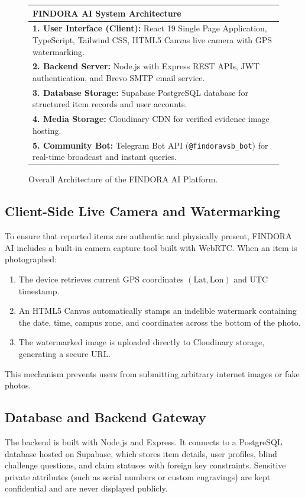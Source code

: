 \documentclass[conference]{IEEEtran}
\begin{document}
\begin{figure}[htbp]
\centering
\small
\setlength{\tabcolsep}{4pt}
\begin{tabular}{|p{}|}
\hline
\textbf{FINDORA AI System Architecture} \\
\hline
\textbf{1. User Interface (Client):} React 19 Single Page Application, TypeScript, Tailwind CSS, HTML5 Canvas live camera with GPS watermarking. \\
\textbf{2. Backend Server:} Node.js with Express REST APIs, JWT authentication, and Brevo SMTP email service. \\
\textbf{3. Database Storage:} Supabase PostgreSQL database for structured item records and user accounts. \\
\textbf{4. Media Storage:} Cloudinary CDN for verified evidence image hosting. \\
\textbf{5. Community Bot:} Telegram Bot API (\texttt{@findoravsb\_bot}) for real-time broadcast and instant queries. \\
\hline
\end{tabular}
\caption{Overall Architecture of the FINDORA AI Platform.}
\label{fig:architecture}
\end{figure}

\subsection{Client-Side Live Camera and Watermarking}
To ensure that reported items are authentic and physically present, FINDORA AI includes a built-in camera capture tool built with WebRTC. When an item is photographed:
\begin{enumerate}
    \item The device retrieves current GPS coordinates $(\text{Lat}, \text{Lon})$ and UTC timestamp.
    \item An HTML5 Canvas automatically stamps an indelible watermark containing the date, time, campus zone, and coordinates across the bottom of the photo.
    \item The watermarked image is uploaded directly to Cloudinary storage, generating a secure URL.
\end{enumerate}
This mechanism prevents users from submitting arbitrary internet images or fake photos.

\subsection{Database and Backend Gateway}
The backend is built with Node.js and Express. It connects to a PostgreSQL database hosted on Supabase, which stores item details, user profiles, blind challenge questions, and claim statuses with foreign key constraints. Sensitive private attributes (such as serial numbers or custom engravings) are kept confidential and are never displayed publicly.
\end{document}
